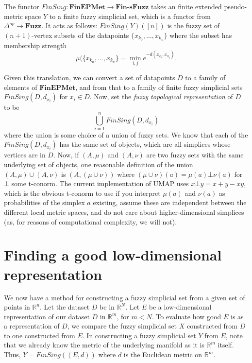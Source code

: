 \documentclass[a4paper,11pt,leqno]{article} \usepackage{amsmath}
\newcommand{\RR}{\mathbb{R}} \newcommand{\QQ}{\mathbb{Q}}
\theoremstyle{definition}
\begin{document}
The functor $FinSing: \textbf{FinEPMet}\to \textbf{Fin-sFuzz}$ takes an finite
extended pseudo-metric space $Y$ to a finite fuzzy simplicial set, which is
a functor from $\Delta^{op}\to \textbf{Fuzz}$.
It acts as follows:
$FinSing(Y)([n])$ is the fuzzy set of $(n+1)$-vertex subsets of the datapoints
$\{x_{k_0},\ldots,x_{k_n}\}$ where the subset has membership strength
$$\mu(\{x_{k_0},\ldots,x_{k_n}\} = \min_{i, j} e^{-d(x_{k_i}, x_{k_j})}.$$

Given this translation, we can convert a set of datapoints $D$ to a family of
elements of $\textbf{FinEPMet}$, and from that to a family of finite fuzzy
simplicial sets $FinSing(D, d_{x_i})$ for $x_i\in D$.
Now, set the \emph{fuzzy
topological representation} of $D$ to be $$\bigcup_{i=1}^n FinSing(D, d_{x_i})$$
where the union is some choice of a union of fuzzy sets.
We know that each of
the $FinSing(D, d_{x_i})$ has the same set of objects, which are all simplices
whose vertices are in $D$.
Now, if $(A, \mu)$ and $(A, \nu)$ are two fuzzy sets
with the same underlying set of objects, one reasonable definition of the union
$(A, \mu) \cup (A, \nu)$ is $(A, (\mu\cup\nu))$ where $(\mu\cup\nu)(a) = \mu(a)
\bot \nu(a)$ for $\bot$ some t-conorm.
The current implementation of UMAP uses
$x\bot y = x+y-xy$, which is the obvious t-conorm to use if you interpret
$\mu(a)$ and $\nu(a)$ as probabilities of the simplex $a$ existing, assume these
are independent between the different local metric spaces, and do not care about
higher-dimensional simplices (as, for reasons of computational complexity, we
will not).

\section{Finding a good low-dimensional representation}

We now have a method for constructing a fuzzy simplicial set from a given set of
points in $\RR^n$.
Let the dataset $D$ be in $\RR^N$.
Let $E$ be
a low-dimensional representation of our dataset $D$ in $\RR^m$, for $m < N$.
To
evaluate how good $E$ is as a representation of $D$, we compare the fuzzy
simplicial set $X$ constructed from $D$ to one constructed from $E$.
In
constructing a fuzzy simplicial set $Y$ from $E$, note that we already know the
metric of the underlying manifold as it is $\RR^m$ itself.
Thus, $Y
= FinSing((E, d))$ where $d$ is the Euclidean metric on $\RR^m$.
\end{document}

